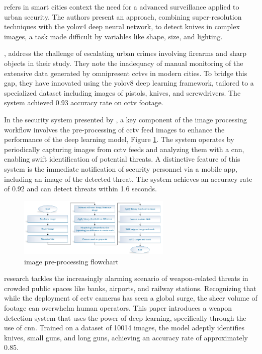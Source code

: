 \citet{rfc18} refers in smart cities context the need for a advanced surveillance applied to urban security. The authors present an approach, combining super-resolution techniques with the \ac{yolo}v4 deep neural network, to detect knives in complex images, a task made difficult by variables like shape, size, and lighting.

\citet{rfc17}, address the challenge of escalating urban crimes involving firearms and sharp objects in their study. They note the inadequacy of manual monitoring of the extensive data generated by omnipresent \ac{cctv}s in modern cities. To bridge this gap, they have innovated using the \ac{yolo}v8 deep learning framework, tailored to a specialized dataset including images of pistols, knives, and screwdrivers. The system achieved 0.93 accuracy rate on \ac{cctv} footage.

In the security system presented by \citet{rfc19}, a key component of the image processing workflow involves the pre-processing of \ac{cctv} feed images to enhance the performance of the deep learning model, Figure \ref{fig:al-mousa-flow}. The system operates by periodically capturing images from \ac{cctv} feeds and analyzing them with a \ac{cnn}, enabling swift identification of potential threats. A distinctive feature of this system is the immediate notification of security personnel via a mobile app, including an image of the detected threat. The system achieves an accuracy rate of 0.92 and can detect threats within 1.6 seconds.

\begin{figure}[h]
    \centering 
    \includegraphics[width=0.65\textwidth]{figs/al-mousa-flowchart.png} 
    \caption{\citet{rfc19} image pre-processing flowchart}
    \label{fig:al-mousa-flow}
\end{figure}

\citet{rfc6} research tackles the increasingly alarming scenario of weapon-related threats in crowded public spaces like banks, airports, and railway stations. Recognizing that while the deployment of \ac{cctv} cameras has seen a global surge, the sheer volume of footage can overwhelm human operators. This paper introduces a weapon detection system that uses the power of deep learning, specifically through the use of \ac{cnn}. Trained on a dataset of 10014 images, the model adeptly identifies knives, small guns, and long guns, achieving an accuracy rate of approximately 0.85.

